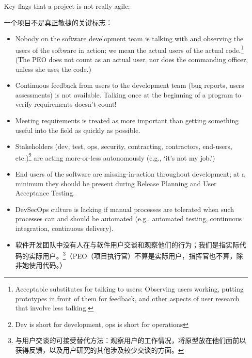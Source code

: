 \documentclass[UTF8, oneside]{ctexbook}
\begin{document}
\begin{paracol}{2}
  \begin{leftcolumn*}
    Key flags that a project is not really agile:
  \end{leftcolumn*}
  \begin{rightcolumn}
    一个项目不是真正敏捷的关键标志：
  \end{rightcolumn}

  \begin{leftcolumn*}
    \begin{itemize}
      \item Nobody on the software development team is talking with and observing the users of the software in action; we mean the actual users of the actual code.\footnote*[1]{Acceptable substitutes for talking to users: Observing users working, putting prototypes in front of them for feedback, and other aspects of user research that involve less talking.} (The PEO does not count as an actual user, nor does the commanding officer, unless she uses the code.)
      \item Continuous feedback from users to the development team (bug reports, users       assessments) is not available. Talking once at the beginning of a program to verify requirements doesn’t count!
      \item Meeting requirements is treated as more important than getting something useful into the field as quickly as possible.
      \item Stakeholders (dev, test, ops, security, contracting, contractors, end-users, etc.)\footnote*[2]{Dev is short for development, ops is short for operations} are acting more-or-less autonomously (e.g., ‘it’s not my job.’)
      \item End users of the software are missing-in-action throughout development; at a minimum they should be present during Release Planning and User Acceptance Testing.
      \item DevSecOps culture is lacking if manual processes are tolerated when such processes can and should be automated (e.g., automated testing, continuous integration, continuous delivery).
    \end{itemize}
  \end{leftcolumn*}
  \begin{rightcolumn}
    \begin{itemize}
      \item 软件开发团队中没有人在与软件用户交谈和观察他们的行为；我们是指实际代码的实际用户。\footnote*[1]{与用户交谈的可接受替代方法：观察用户的工作情况，将原型放在他们面前以获得反馈，以及用户研究的其他涉及较少交谈的方面。}（PEO（项目执行官）不算是实际用户，指挥官也不算，除非她使用代码。）

\end{itemize}
\end{rightcolumn}
\end{paracol}
\end{document}
